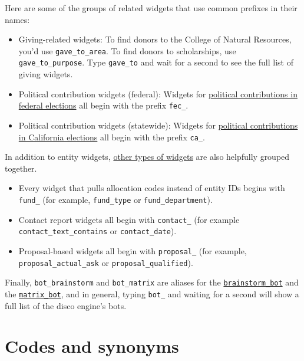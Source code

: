 \documentclass[]{book}
\providecommand{\tightlist}{%
  \setlength{\itemsep}{0pt}\setlength{\parskip}{0pt}}
\begin{document}
Here are some of the groups of related widgets that use common prefixes in their names:

\begin{itemize}
\tightlist
\item
  Giving-related widgets: To find donors to the College of Natural Resources, you'd use \texttt{gave\_to\_area}. To find donors to scholarships, use \texttt{gave\_to\_purpose}. Type \texttt{gave\_to} and wait for a second to see the full list of giving widgets.
\item
  Political contribution widgets (federal): Widgets for \protect\hyperlink{ex-fec}{political contributions in federal elections} all begin with the prefix \texttt{fec\_}.
\item
  Political contribution widgets (statewide): Widgets for \protect\hyperlink{ex-ca-campaign}{political contributions in California elections} all begin with the prefix \texttt{ca\_}.
\end{itemize}

In addition to entity widgets, \protect\hyperlink{non-entity-widgets}{other types of widgets} are also helpfully grouped together.

\begin{itemize}
\tightlist
\item
  Every widget that pulls allocation codes instead of entity IDs begins with \texttt{fund\_} (for example, \texttt{fund\_type} or \texttt{fund\_department}).
\item
  Contact report widgets all begin with \texttt{contact\_} (for example \texttt{contact\_text\_contains} or \texttt{contact\_date}).
\item
  Proposal-based widgets all begin with \texttt{proposal\_} (for example, \texttt{proposal\_actual\_ask} or \texttt{proposal\_qualified}).
\end{itemize}

Finally, \texttt{bot\_brainstorm} and \texttt{bot\_matrix} are aliases for the \protect\hyperlink{brainstorm-bot}{\texttt{brainstorm\_bot}} and the \protect\hyperlink{matrix-bot}{\texttt{matrix\_bot}}, and in general, typing \texttt{bot\_} and waiting for a second will show a full list of the disco engine's bots.

\hypertarget{working-with-codes-synonyms}{%
\section{Codes and synonyms}\label{working-with-codes-synonyms}}
\end{document}
